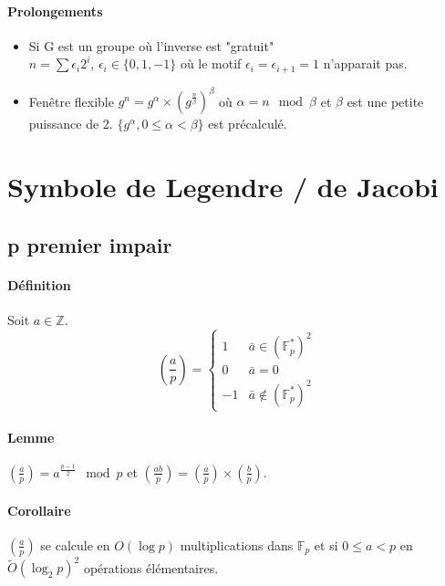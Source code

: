 \documentclass[12pt,a4paper]{report}
\begin{document}
\paragraph{Prolongements\\}
\begin{itemize}
\item Si G est un groupe où l'inverse est "gratuit"\\
$\displaystyle n = \sum \epsilon_i 2^i$, $\epsilon_i \in \{0,1,-1\}$ où le motif $\epsilon_i = \epsilon_{i+1} = 1$ n'apparait pas.
\item Fenêtre flexible $g^n= g^{\alpha} \times \left(g^{\frac{n}{\beta}}\right)^{\beta} $ où $ \alpha = n \mod \beta$ et $ \beta $ est une petite puissance de 2. $\{g^{\alpha}, 0 \leqslant \alpha < \beta \}$ est précalculé.
\end{itemize}
\section{Symbole de Legendre / de Jacobi}
\subsection{p premier impair}
\paragraph{Définition\\}
Soit $a \in \mathbb{Z}$.
$$ \left(\frac{a}{p}\right)=\left\{ \begin{array}{ll}
1 & \bar{a}\in \left(\mathbb{F}_p^*\right)^2\\
0 & \bar{a} = 0 \\
-1 & \bar{a}\not \in  \left(\mathbb{F}_p^*\right)^2 \end{array} \right.$$
\paragraph{Lemme\\}
$\left(\frac{a}{p}\right) = a^{\frac{p-1}{2}} \mod p $ et $ \left(\frac{ab}{p}\right)=\left(\frac{a}{p}\right)\times \left(\frac{b}{p}\right)$.
\paragraph{Corollaire\\}
$\left(\frac{a}{p}\right)$ se calcule en $O(\log p)$ multiplications dans $\mathbb{F}_p$ et si $0 \leqslant a < p $ en $\tilde{O}(\log_2 p)^2$ opérations élémentaires.
\end{document}
